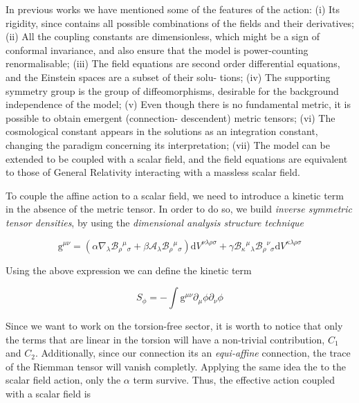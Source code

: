 \documentclass[10pt,a4paper]{article}
\begin{document}
In previous works we have mentioned some of the features of the action: (i) Its rigidity, since contains all possible combinations of the fields and their derivatives; 
(ii) All the coupling constants are dimensionless, which might be a sign of conformal invariance, and also ensure that the model is power-counting renormalisable; 
(iii) The field equations are second order differential equations, and the Einstein spaces are a subset of their solu- tions; 
(iv) The supporting symmetry group is the group of diffeomorphisms, desirable for the background independence of the model; 
(v) Even though there is no fundamental metric, it is possible to obtain emergent (connection- descendent) metric tensors; 
(vi) The cosmological constant appears in the solutions as an integration constant, changing the paradigm concerning its interpretation; 
(vii) The model can be extended to be coupled with a scalar field, and the field equations are equivalent to those of General Relativity interacting with a massless scalar field. 



To couple the affine action to a scalar field, we need to introduce a kinetic term in the absence of the metric tensor. In order to do so, we build 
\textit{inverse symmetric tensor densities}, by using the \textit{dimensional analysis structure technique}

\begin{equation}
    \mathrm{g}^{\mu\nu} = \left(\alpha \nabla_\lambda \mathcal{B}_{\rho}{ }^{\mu}{ }_{\sigma} + \beta \mathcal{A}_\lambda 
    \mathcal{B}_{\rho}{ }^{\mu}{ }_{\sigma}\right)\mathrm{d}V^{\nu\lambda\rho\sigma} + \gamma \mathcal{B}_{\kappa}{ }^{\mu}{ }_{\lambda}
    \mathcal{B}_{\rho}{ }^{\nu}{ }_{\sigma}\mathrm{d}V^{\kappa\lambda\rho\sigma}
\end{equation}

Using the above expression we can define the kinetic term 

\begin{equation}
    S_{\phi} = - \int \mathrm{g}^{\mu\nu} \partial_{\mu} \phi \partial_{\nu} \phi
\end{equation}

Since we want to work on the torsion-free sector, it is worth to notice that only the terms that are linear in the torsion will
have a non-trivial contribution, $C_1$ and $C_2$. Additionally, since our connection its an \textit{equi-affine} connection, the trace of the
Riemman tensor will vanish completly. Applying the same idea the to the scalar field action, only the $\alpha$ term survive. Thus,
the effective action coupled with a scalar field is
\end{document}
